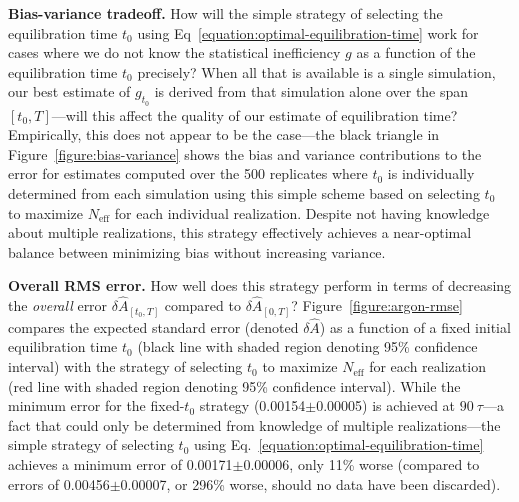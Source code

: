 \documentclass[aps,pre,twocolumn,nofootinbib,superscriptaddress,linenumbers,11point]{revtex4-1}
\begin{document}
{\bf Bias-variance tradeoff.} 
How will the simple strategy of selecting the equilibration time $t_0$ using Eq~\ref{equation:optimal-equilibration-time} work for cases where we do not know the statistical inefficiency $g$ as a function of the equilibration time $t_0$ precisely?
When all that is available is a single simulation, our best estimate of $g_{t_0}$ is derived from that simulation alone over the span $[t_0,T]$---will this affect the quality of our estimate of equilibration time?
Empirically, this does not appear to be the case---the black triangle in Figure~\ref{figure:bias-variance} shows the bias and variance contributions to the error for estimates computed over the 500 replicates where $t_0$ is individually determined from each simulation using this simple scheme based on selecting $t_0$ to maximize $N_\mathrm{eff}$ for each individual realization.
Despite not having knowledge about multiple realizations, this strategy effectively achieves a near-optimal balance between minimizing bias without increasing variance.

{\bf Overall RMS error.} 
How well does this strategy perform in terms of decreasing the \emph{overall} error $\delta \hat{A}_{[t_0,T]}$ compared to $\delta \hat{A}_{[0,T]}$?
Figure~\ref{figure:argon-rmse} compares the expected standard error (denoted $\delta \hat{A}$) as a function of a fixed initial equilibration time $t_0$ (black line with shaded region denoting 95\% confidence interval) with the strategy of selecting $t_0$ to maximize $N_\mathrm{eff}$ for each realization (red line with shaded region denoting 95\% confidence interval).
While the minimum error for the fixed-$t_0$ strategy (0.00154$\pm$0.00005) is achieved at $90~\tau$---a fact that could only be determined from knowledge of multiple realizations---the simple strategy of selecting $t_0$ using Eq.~\ref{equation:optimal-equilibration-time} achieves a minimum error of 0.00171$\pm$0.00006, only 11\% worse (compared to errors of 0.00456$\pm$0.00007, or 296\% worse, should no data have been discarded).

\end{document}
